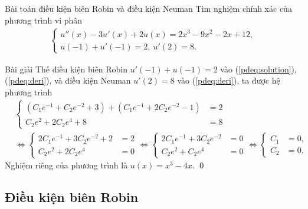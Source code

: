 \documentclass[9pt]{beamer}
\numberwithin{equation}{section}
\begin{document}
\begin{frame}
\begin{block}{Bài toán điều kiện biên Robin và điều kiện Neuman}
    Tìm nghiệm chính xác của phương trình vi phân
    \begin{align*}
        \begin{cases}
        u''(x) - 3u'(x) + 2u(x) = 2x^3 - 9x^2 - 2x + 12, \\
        u(-1) + u'(-1) = 2, \ u'(2) = 8.
        \end{cases} 
    \end{align*}
\end{block}
\begin{exampleblock}{Bài giải}
    Thế điều kiện biên Robin $u'(-1) + u(-1) = 2$ vào (\ref{pdeq:solution}), (\ref{pdeq:deri}), và điều kiện Neuman $u'(2) = 8$ vào (\ref{pdeq:deri}), ta được hệ phương trình
    \begin{align*}
        &\begin{cases}
        (C_1 e^{-1} + C_2 e^{-2} + 3) + (C_1 e^{-1} + 2C_2 e^{-2} - 1) &= 2 \\
        C_2 e^2 + 2C_2 e^4 +8 &= 8
        \end{cases} \\
        &\Leftrightarrow
        \begin{cases}
        2C_1 e^{-1} + 3C_2 e^{-2} + 2 &= 2 \\
        C_2 e^2 + 2C_2 e^4 &= 0
        \end{cases} \Leftrightarrow
        \begin{cases}
        2C_1 e^{-1} + 3C_2 e^{-2} &= 0 \\
        C_2 e^2 + C_2 e^4 &= 0
        \end{cases} \Leftrightarrow
        \begin{cases}
        C_1 &= 0, \\ C_2 &= 0.
        \end{cases}
    \end{align*}
    Nghiệm riêng của phương trình là $u(x) = x^3 - 4x.$ \hfill \qed
\end{exampleblock}
\end{frame}

\subsection{Điều kiện biên Robin}
\end{document}
